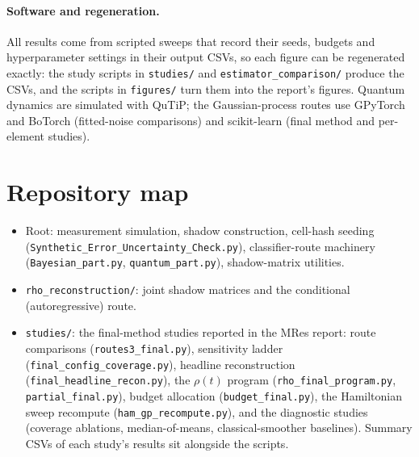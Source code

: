 \documentclass[11pt]{article}
\begin{document}
\paragraph{Software and regeneration.} All results come from scripted sweeps that record their seeds,
budgets and hyperparameter settings in their output CSVs, so each figure can be regenerated exactly: the
study scripts in \texttt{studies/} and \texttt{estimator\_comparison/} produce the CSVs, and the scripts in
\texttt{figures/} turn them into the report's figures. Quantum dynamics are simulated with QuTiP; the
Gaussian-process routes use GPyTorch and BoTorch (fitted-noise comparisons) and scikit-learn (final
method and per-element studies).

\section{Repository map}
\begin{itemize}
  \item Root: measurement simulation, shadow construction, cell-hash seeding
    (\texttt{Synthetic\_Error\_Uncertainty\_Check.py}), classifier-route machinery
    (\texttt{Bayesian\_part.py}, \texttt{quantum\_part.py}), shadow-matrix utilities.
  \item \texttt{rho\_reconstruction/}: joint shadow matrices and the conditional (autoregressive) route.
  \item \texttt{studies/}: the final-method studies reported in the MRes report: route
    comparisons (\texttt{routes3\_final.py}), sensitivity ladder
    (\texttt{final\_config\_coverage.py}), headline reconstruction
    (\texttt{final\_headline\_recon.py}), the $\rho(t)$ program (\texttt{rho\_final\_program.py},
    \texttt{partial\_final.py}), budget allocation (\texttt{budget\_final.py}), the Hamiltonian sweep
    recompute (\texttt{ham\_gp\_recompute.py}), and the diagnostic studies (coverage ablations,
    median-of-means, classical-smoother baselines). Summary CSVs of each study's results sit alongside
    the scripts.
\end{itemize}
\end{document}

